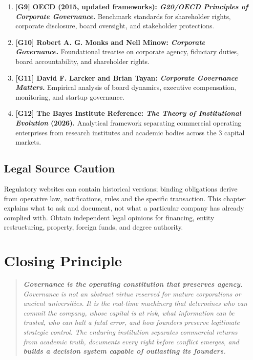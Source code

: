 \begin{enumerate}
    \item \textbf{[G9] OECD (2015, updated frameworks): \textit{G20/OECD Principles of Corporate Governance}.} Benchmark standards for shareholder rights, corporate disclosure, board oversight, and stakeholder protections.
    \item \textbf{[G10] Robert A. G. Monks and Nell Minow: \textit{Corporate Governance}.} Foundational treatise on corporate agency, fiduciary duties, board accountability, and shareholder rights.
    \item \textbf{[G11] David F. Larcker and Brian Tayan: \textit{Corporate Governance Matters}.} Empirical analysis of board dynamics, executive compensation, monitoring, and startup governance.
    \item \textbf{[G12] The Bayes Institute Reference: \textit{The Theory of Institutional Evolution} (2026).} Analytical framework separating commercial operating enterprises from research institutes and academic bodies across the 3 capital markets.
\end{enumerate}

\subsection*{Legal Source Caution}

Regulatory websites can contain historical versions; binding obligations derive from operative law, notifications, rules and the specific transaction. This chapter explains what to ask and document, not what a particular company has already complied with. Obtain independent legal opinions for financing, entity restructuring, property, foreign funds, and degree authority.

\section*{Closing Principle}

\begin{quote}
\itshape
\textbf{Governance is the operating constitution that preserves agency.} Governance is not an abstract virtue reserved for mature corporations or ancient universities. It is the real-time machinery that determines who can commit the company, whose capital is at risk, what information can be trusted, who can halt a fatal error, and how founders preserve legitimate strategic control. The enduring institution separates commercial returns from academic truth, documents every right before conflict emerges, and \textbf{builds a decision system capable of outlasting its founders.}
\end{quote}
